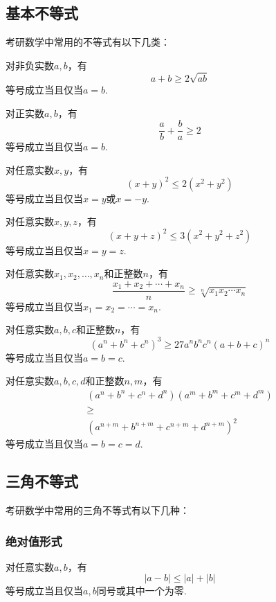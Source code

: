 \subsection{基本不等式}

考研数学中常用的不等式有以下几类：

对非负实数$a,b$，有
\begin{equation}
	a+b \geq 2\sqrt {ab}
\end{equation}
等号成立当且仅当$a=b$.

对正实数$a,b$，有
\begin{equation}
	\dfrac{a}{b}+\dfrac{b}{a} \geq 2
\end{equation}
等号成立当且仅当$a=b$.

对任意实数$x,y$，有
\begin{equation}
	(x+y)^2 \leq 2(x^2+y^2)
\end{equation}
等号成立当且仅当$x=y$或$x=-y$.

对任意实数$x,y,z$，有
\begin{equation}
	(x+y+z)^2 \leq 3(x^2+y^2+z^2)
\end{equation}
等号成立当且仅当$x=y=z$.

对任意实数$x_1,x_2,\dots,x_n$和正整数$n$，有
\begin{equation}
	\dfrac{x_1+x_2+\cdots+x_n}{n} \geq \sqrt[n]{x_1x_2\cdots x_n}
\end{equation}
等号成立当且仅当$x_1=x_2=\cdots=x_n$.

对任意实数$a,b,c$和正整数$n$，有
\begin{equation}
	(a^n+b^n+c^n)^3 \geq 27a^nb^nc^n(a+b+c)^n
\end{equation}
等号成立当且仅当$a=b=c$.

对任意实数$a,b,c,d$和正整数$n,m$，有
\begin{equation}
	\begin{array}{c}
		(a^n+b^n+c^n+d^n)(a^m+b^m+c^m+d^m)\\ \geq \\(a^{n+m}+b^{n+m}+c^{n+m}+d^{n+m})^2
	\end{array}
\end{equation}
等号成立当且仅当$a=b=c=d$.

\subsection{三角不等式}
考研数学中常用的三角不等式有以下几种：

\subsubsection{绝对值形式}
对任意实数$a,b$，有
\begin{equation}
	|a-b| \leq |a|+|b|
\end{equation}
等号成立当且仅当$a,b$同号或其中一个为零.

